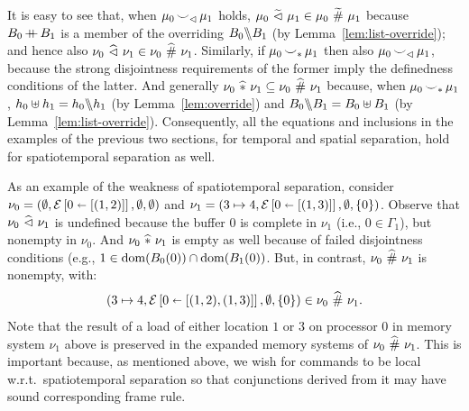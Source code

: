 \documentclass[11pt]{report}         %
\begin{document}
It is easy to see that, when $\mu_0 \operatorname{\smile}_\vartriangleleft \mu_1$ holds, $\mu_0 \operatorname{\,\widetilde{\vartriangleleft}\,} \mu_1 \in \mu_0 \operatorname{\,\widetilde{\#}\,} \mu_1$ because $B_0 \operatorname{+\!\!\!+} B_1$ is a member of the overriding $B_0 \backslash\!\!\backslash B_1$ (by Lemma~\ref{lem:list-override}); and hence also $\nu_0 \operatorname{\,\widehat{\vartriangleleft}\,} \nu_1 \in \nu_0 \operatorname{\,\widehat{\#}\,} \nu_1$. Similarly, if $\mu_0 \operatorname{\smile}_\ast \mu_1$ then also $\mu_0 \operatorname{\smile}_\vartriangleleft \mu_1$, because the strong disjointness requirements of the former imply the definedness conditions of the latter. And generally $\nu_0 \operatorname{\,\widehat{\ast}\,} \nu_1 \subseteq \nu_0 \operatorname{\,\widehat{\#}\,} \nu_1$ because, when $\mu_0 \operatorname{\smile}_\ast \mu_1$, $h_0 \uplus h_1 = h_0 \backslash\!\!\backslash h_1$ (by Lemma~\ref{lem:override}) and $B_0 \backslash\!\!\backslash B_1 = B_0 \uplus B_1$ (by Lemma~\ref{lem:list-override}). Consequently, all the equations and inclusions in the examples of the previous two sections, for temporal and spatial separation, hold for spatiotemporal separation as well. 

As an example of the weakness of spatiotemporal separation, consider $\nu_0 = (\operatorname{\emptyset},\mathcal{E} \left[ 0 \shortleftarrow \left[(1,2)\right] \right],\operatorname{\emptyset},\operatorname{\emptyset})$ and $\nu_1 = (3 \mapsto 4,\mathcal{E} \left[ 0 \shortleftarrow \left[(1,3)\right] \right],\operatorname{\emptyset},\left\lbrace 0 \right\rbrace)$. Observe that $\nu_0 \operatorname{\,\widehat{\vartriangleleft}\,} \nu_1$ is undefined because the buffer 0 is complete in $\nu_1$ (i.e., $0 \in \Gamma_1$), but nonempty in $\nu_0$. And $\nu_0 \operatorname{\,\widehat{\ast}\,} \nu_1$ is empty as well because of failed disjointness conditions (e.g., $1 \in \operatorname{\mathrm{dom}}(B_0(0)) \cap \operatorname{\mathrm{dom}}(B_1(0))$. But, in contrast, $\nu_0 \operatorname{\,\widehat{\#}\,} \nu_1$ is nonempty, with: \[ (3 \mapsto 4,\mathcal{E} \left[ 0 \shortleftarrow \left[(1,2),(1,3)\right] \right],\operatorname{\emptyset},\left\lbrace 0 \right\rbrace) \in \nu_0 \operatorname{\,\widehat{\#}\,} \nu_1.\] Note that the result of a load of either location $1$ or $3$ on processor 0 in memory system $\nu_1$ above is preserved in the expanded memory systems of $\nu_0 \operatorname{\,\widehat{\#}\,} \nu_1$. This is important because, as mentioned above, we wish for commands to be local w.r.t.\ spatiotemporal separation so that conjunctions derived from it may have sound corresponding frame rule. 
\end{document}
